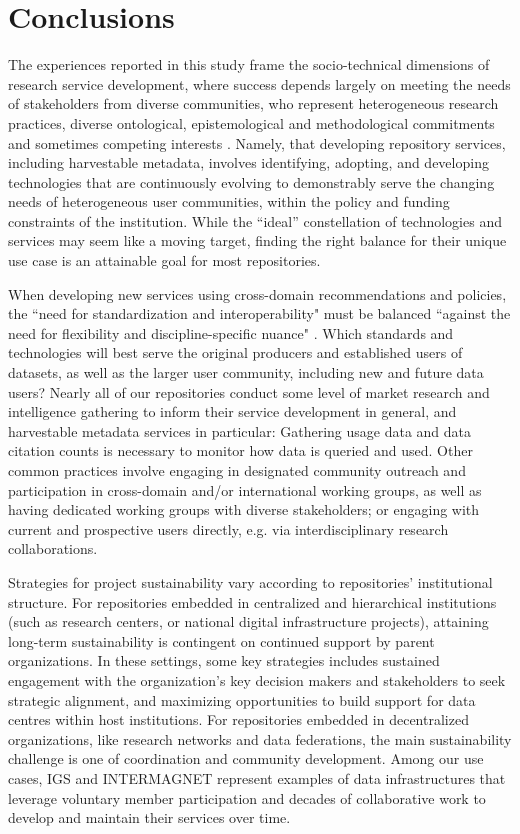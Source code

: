 \documentclass{interact}
\begin{document}
\section{Conclusions}\label{conclusion}

The experiences reported in this study frame the socio-technical dimensions of research service development, where success depends largely on meeting the needs of stakeholders from diverse communities, who represent heterogeneous research practices, diverse ontological, epistemological and methodological commitments and sometimes competing interests \parencite{poirier_data_2019}. Namely, that developing repository services, including harvestable metadata, involves identifying, adopting, and developing technologies that are continuously evolving to demonstrably
serve the changing needs of heterogeneous user communities, within the policy and funding constraints of the institution. While the ``ideal'' constellation of technologies and services may seem like a moving target, finding the right balance for their unique use case is an attainable goal for most repositories.

When developing new services using cross-domain recommendations and policies, the ``need for standardization and interoperability" must be balanced ``against the need for flexibility and discipline-specific nuance" \parencite{goddard_rdm_2021}. Which standards and technologies will best serve the original producers and established users of datasets, as well as the larger user community, including new and future data users? Nearly all of our repositories conduct some level of market research and intelligence gathering to inform their service development in general, and harvestable metadata services in particular: Gathering usage data and data citation counts is necessary to monitor how data is queried and used. Other common practices involve engaging in designated community outreach and participation in cross-domain and/or international working groups, as well as having dedicated working groups with diverse stakeholders; or engaging with current and prospective users directly, e.g. via interdisciplinary research collaborations.

Strategies for project sustainability vary according to repositories' institutional structure. For repositories embedded in centralized and hierarchical institutions (such as research centers, or national digital infrastructure projects), attaining long-term sustainability is contingent on continued support by parent organizations. In these settings, some key strategies includes sustained engagement with the organization's key decision makers and stakeholders to seek strategic alignment, and maximizing opportunities to build support for data centres within host institutions. For repositories embedded in decentralized organizations, like research networks and data federations, the main sustainability challenge is one of coordination and community development. Among our use cases, IGS and INTERMAGNET represent examples of data infrastructures that leverage voluntary member participation and decades of collaborative work to develop and maintain their services over time.
\end{document}
